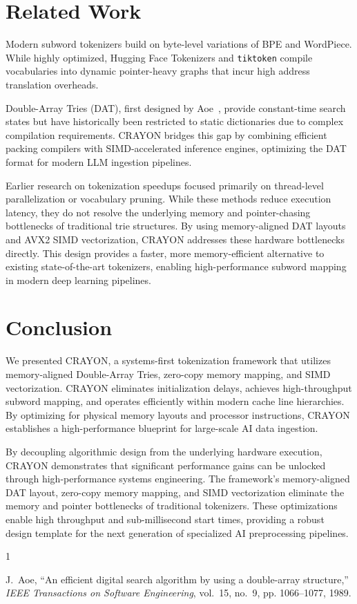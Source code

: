 \documentclass[10pt,journal,compsoc]{IEEEtran}
\begin{document}
\section{Related Work}
Modern subword tokenizers build on byte-level variations of BPE and WordPiece. While highly optimized, Hugging Face Tokenizers and \texttt{tiktoken} compile vocabularies into dynamic pointer-heavy graphs that incur high address translation overheads.

Double-Array Tries (DAT), first designed by Aoe~\cite{aoe1989efficient}, provide constant-time search states but have historically been restricted to static dictionaries due to complex compilation requirements. CRAYON bridges this gap by combining efficient packing compilers with SIMD-accelerated inference engines, optimizing the DAT format for modern LLM ingestion pipelines.

Earlier research on tokenization speedups focused primarily on thread-level parallelization or vocabulary pruning. While these methods reduce execution latency, they do not resolve the underlying memory and pointer-chasing bottlenecks of traditional trie structures. By using memory-aligned DAT layouts and AVX2 SIMD vectorization, CRAYON addresses these hardware bottlenecks directly. This design provides a faster, more memory-efficient alternative to existing state-of-the-art tokenizers, enabling high-performance subword mapping in modern deep learning pipelines.

\section{Conclusion}
We presented CRAYON, a systems-first tokenization framework that utilizes memory-aligned Double-Array Tries, zero-copy memory mapping, and SIMD vectorization. CRAYON eliminates initialization delays, achieves high-throughput subword mapping, and operates efficiently within modern cache line hierarchies. By optimizing for physical memory layouts and processor instructions, CRAYON establishes a high-performance blueprint for large-scale AI data ingestion.

By decoupling algorithmic design from the underlying hardware execution, CRAYON demonstrates that significant performance gains can be unlocked through high-performance systems engineering. The framework’s memory-aligned DAT layout, zero-copy memory mapping, and SIMD vectorization eliminate the memory and pointer bottlenecks of traditional tokenizers. These optimizations enable high throughput and sub-millisecond start times, providing a robust design template for the next generation of specialized AI preprocessing pipelines.


\begin{thebibliography}{1}

J.~Aoe, ``An efficient digital search algorithm by using a double-array structure,'' \emph{IEEE Transactions on Software Engineering}, vol.~15, no.~9, pp. 1066--1077, 1989.

\end{thebibliography}
\end{document}
